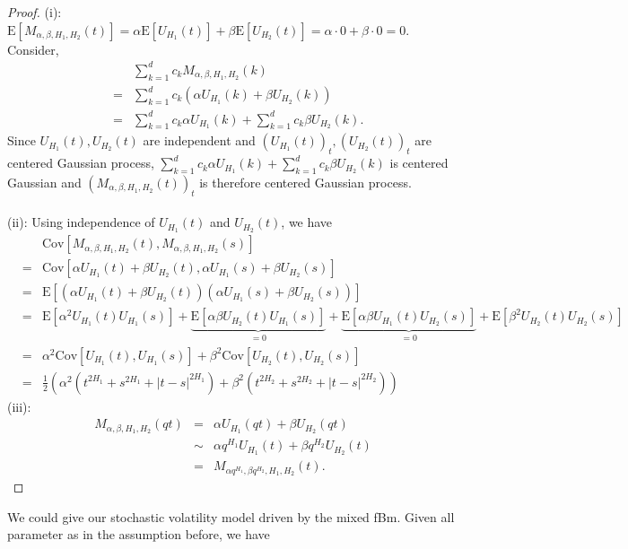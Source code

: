 \documentclass[a4paper, twoside, 11pt]{article}
\theoremstyle{definition}
\newcommand{\brkt}[1]{\left({#1} \right)}
\begin{document}
\begin{proof}
  (i): $\mathrm{E}[M_{\alpha,\beta,H_1,H_2}(t)] = \alpha \mathrm{E}[U_{H_1}(t)] + \beta \mathrm{E}[U_{H_2}(t)] = \alpha \cdot 0 + \beta \cdot 0 = 0$.
  Consider,
  \begin{eqnarray*}
	&&\sum\limits_{k=1}^{d} c_k M_{\alpha,\beta,H_1,H_2}(k)\\
	&=& \sum\limits_{k=1}^{d} c_k (\alpha U_{H_1}(k) + \beta U_{H_2}(k))\\
	&=& \sum\limits_{k=1}^{d} c_k \alpha U_{H_1}(k) + \sum\limits_{k=1}^{d} c_k \beta U_{H_2}(k).
  \end{eqnarray*}
  Since $U_{H_1}(t), U_{H_2}(t)$ are independent and $(U_{H_1}(t))_t, (U_{H_2}(t))_t$ are centered Gaussian process, $\sum\limits_{k=1}^{d} c_k \alpha U_{H_1}(k) + \sum\limits_{k=1}^{d} c_k \beta U_{H_2}(k)$ is centered Gaussian and $(M_{\alpha,\beta,H_1,H_2}(t))_t$ is therefore centered Gaussian process. \\
  \\
  (ii): Using independence of $U_{H_1}(t)$ and $U_{H_2}(t)$, we have
  \begin{eqnarray*}
	&&\mathrm{Cov}[M_{\alpha,\beta,H_1,H_2}(t), M_{\alpha,\beta,H_1,H_2}(s)]\\
	&=& \mathrm{Cov}[\alpha U_{H_1}(t)+\beta U_{H_2}(t), \alpha U_{H_1}(s)+\beta U_{H_2}(s)]\\
	&=& \mathrm{E}[(\alpha U_{H_1}(t)+\beta U_{H_2}(t)) (\alpha U_{H_1}(s)+\beta U_{H_2}(s))]\\
	&=& \mathrm{E}[\alpha^2U_{H_1}(t)U_{H_1}(s)] + \underbrace{\mathrm{E}[\alpha \beta U_{H_2}(t)U_{H_1}(s)]}_{=0} + \underbrace{\mathrm{E}[\alpha\beta U_{H_1}(t)U_{H_2}(s)]}_{=0} +\mathrm{E}[\beta^2 U_{H_2}(t)U_{H_2}(s)] \\
	&=& \alpha^2 \mathrm{Cov}[U_{H_1}(t), U_{H_1}(s)] + \beta^2\mathrm{Cov}[U_{H_2}(t), U_{H_2}(s)]\\
    &=& \frac{1}{2}\brkt{\alpha^2(t^{2H_1}+s^{2H_1}+|t-s|^{2H_1}) + \beta^2(t^{2H_2} + s^{2H_2} + |t-s|^{2H_2})}
  \end{eqnarray*}
(iii): 
\begin{eqnarray*}
  M_{\alpha,\beta,H_1,H_2}(qt) &=&  \alpha U_{H_1}(qt)+\beta U_{H_2}(qt)\\
  &\sim& \alpha q^{H_1} U_{H_1}(t) + \beta q^{H_2} U_{H_2}(t)\\
  &=& M_{\alpha q^{H_1}, \beta q^{H_2}, H_1, H_2}(t).
\end{eqnarray*}
\end{proof}
We could give our stochastic volatility model driven by the mixed fBm. Given all parameter as in the assumption before, we have 
\end{document}
